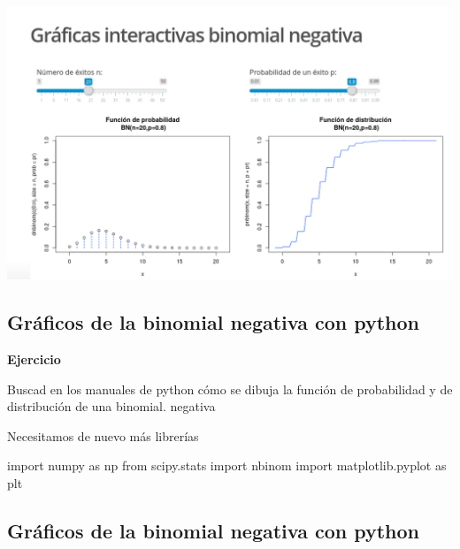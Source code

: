 \documentclass[]{book}
\newenvironment{Shaded}{\begin{snugshade}}{\end{snugshade}}
\newcommand{\ImportTok}[1]{#1}
\newcommand{\NormalTok}[1]{#1}
\begin{document}
\href{https://joanby.shinyapps.io/DistribucionesNotables/}{\includegraphics{Images/noshinyImages/interactiva_binomial_negativa1.png}}

\hypertarget{gruxe1ficos-de-la-binomial-negativa-con-python}{%
\subsection{Gráficos de la binomial negativa con python}\label{gruxe1ficos-de-la-binomial-negativa-con-python}}

\textbf{Ejercicio}

Buscad en los manuales de python cómo se dibuja la función de probabilidad y de distribución de una binomial.
negativa

Necesitamos de nuevo más librerías

\begin{Shaded}
\begin{Highlighting}[]
\ImportTok{import}\NormalTok{ numpy }\ImportTok{as}\NormalTok{ np}
\ImportTok{from}\NormalTok{ scipy.stats }\ImportTok{import}\NormalTok{ nbinom}
\ImportTok{import}\NormalTok{ matplotlib.pyplot }\ImportTok{as}\NormalTok{ plt}
\end{Highlighting}
\end{Shaded}

\hypertarget{gruxe1ficos-de-la-binomial-negativa-con-python-1}{%
\subsection{Gráficos de la binomial negativa con python}\label{gruxe1ficos-de-la-binomial-negativa-con-python-1}}
\end{document}
